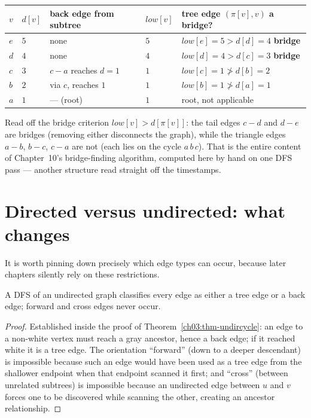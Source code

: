 \begin{center}
\begin{tabular}{@{}lllll@{}}
\toprule
$v$ & $d[v]$ & back edge from subtree & $\mathit{low}[v]$ & tree edge $(\pi[v],v)$ a bridge? \\
\midrule
$e$ & $5$ & none & $5$ & $\mathit{low}[e]=5>d[d]=4$ \;\textbf{bridge} \\
$d$ & $4$ & none & $4$ & $\mathit{low}[d]=4>d[c]=3$ \;\textbf{bridge} \\
$c$ & $3$ & $c{-}a$ reaches $d{=}1$ & $1$ & $\mathit{low}[c]=1\not>d[b]=2$ \\
$b$ & $2$ & via $c$, reaches $1$ & $1$ & $\mathit{low}[b]=1\not>d[a]=1$ \\
$a$ & $1$ & --- (root) & $1$ & root, not applicable \\
\bottomrule
\end{tabular}
\end{center}

Read off the bridge criterion $\mathit{low}[v]>d[\pi[v]]$: the tail edges $c-d$ and $d-e$ are bridges (removing either disconnects the graph), while the triangle edges $a-b$, $b-c$, $c-a$ are not (each lies on the cycle $a\,b\,c$). That is the entire content of Chapter~10's bridge-finding algorithm, computed here by hand on one DFS pass --- another structure read straight off the timestamps.

\section{Directed versus undirected: what changes}
\label{ch03:dir-vs-undir}

It is worth pinning down precisely which edge types can occur, because later chapters silently rely on these restrictions.

\begin{proposition}\label{ch03:prop-undir-edges}
A DFS of an undirected graph classifies every edge as either a tree edge or a back edge; forward and cross edges never occur.
\end{proposition}

\begin{proof}
Established inside the proof of Theorem~\ref{ch03:thm-undircycle}: an edge to a non-white vertex must reach a gray ancestor, hence a back edge; if it reached white it is a tree edge. The orientation ``forward'' (down to a deeper descendant) is impossible because such an edge would have been used as a tree edge from the shallower endpoint when that endpoint scanned it first; and ``cross'' (between unrelated subtrees) is impossible because an undirected edge between $u$ and $v$ forces one to be discovered while scanning the other, creating an ancestor relationship.
\end{proof}

